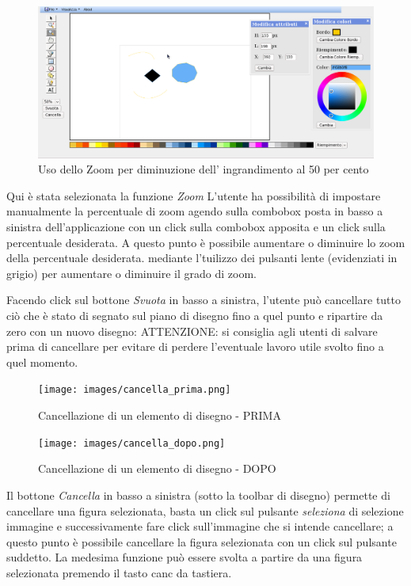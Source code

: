 \begin{figure}[!ht]
\centering
\includegraphics[scale=0.4]{images/zoom_meno.png}
\caption{Uso dello Zoom per diminuzione dell' ingrandimento al 50 per cento}
\end{figure} 

\vspace{100pt}
Qui \`e stata selezionata la funzione \textit{Zoom} L'utente ha possibilit\`a di impostare manualmente la percentuale di zoom agendo sulla combobox posta in basso a sinistra dell'applicazione con un click sulla combobox apposita e un click sulla percentuale desiderata. A questo punto è possibile aumentare o diminuire lo zoom della percentuale desiderata. mediante l'tuilizzo dei pulsanti lente (evidenziati in grigio) per aumentare o diminuire il grado di zoom.
 

\vspace{100pt}
Facendo click sul bottone \textit{Svuota} in basso a sinistra, l'utente pu\`o cancellare tutto ci\`o che \`e stato di segnato sul piano di disegno fino a quel punto e ripartire da zero con un nuovo disegno: ATTENZIONE: si consiglia agli utenti di salvare prima di cancellare per evitare di perdere l'eventuale lavoro utile svolto fino a quel momento.

\begin{figure}[!ht]
\centering
\texttt{[image: images/cancella\_prima.png]}
\caption{Cancellazione di un elemento di disegno  - PRIMA}
\end{figure} 

\begin{figure}[!ht]
\centering
\texttt{[image: images/cancella\_dopo.png]}
\caption{Cancellazione di un elemento di disegno  - DOPO}
\end{figure}

\vspace{100pt}
Il bottone \textit{Cancella} in basso a sinistra (sotto la toolbar di disegno) permette di cancellare una figura selezionata, 
basta un click sul pulsante \textit{seleziona} di selezione immagine e successivamente fare click sull'immagine che si intende cancellare; a questo punto \`e possibile cancellare la figura selezionata con un click sul pulsante suddetto. La medesima funzione può essere svolta a partire da una figura selezionata premendo il tasto canc da tastiera.

